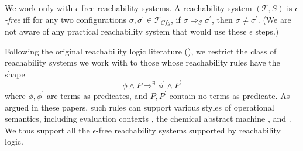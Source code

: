 \begin{remark}\label{rem:noEmptySteps}
  We work only with $\epsilon$-free reachability systems.
  A reachability system $(\mathcal{T}, S)$ is \emph{$\epsilon$-free}
  iff for any two configurations $\sigma, \sigma^\prime \in \mathcal{T}_{\mathit{Cfg}}$, if
  $\sigma \Rightarrow_{\mathcal{S}} \sigma^\prime$, then $\sigma \not = \sigma^\prime$.
  (We are not aware of any practical reachability system that would use these $\epsilon$ steps.)
  \end{remark}

\begin{remark}\label{rem:shapeOfReachabilityRules}
  Following the original reachability logic literature (\cite{RosuS12oopsla,StefanescuCMMSR19}),
  we restrict the class of reachability systems we work with to those whose reachability rules
have the shape
\begin{equation*}
    \phi \land P \Rightarrow^\exists \phi^\prime \land P^\prime
\end{equation*}
where $\phi,\phi^\prime$ are terms-as-predicates, and $P,P^\prime$ contain no terms-as-predicate.
  As argued in these papers, such rules can support various styles of operational semantics,
  including evaluation contexts \cite{PLTRedex}, the chemical abstract machine \cite{CHAM}, and \K{} \cite{KVision}.
  We thus support all the $\epsilon$-free reachability systems supported by reachability logic.
\end{remark}

